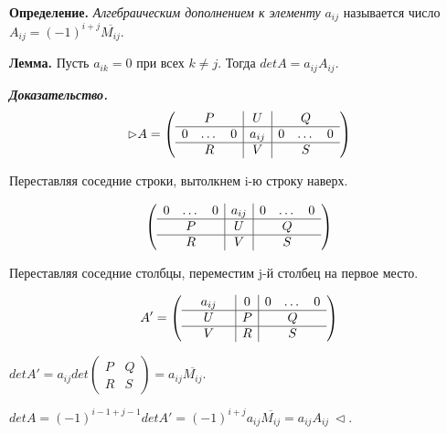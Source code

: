 \bigskip
\textbf{Определение.} \textit{Алгебраическим дополнением к элементу} $a_{ij}$ называется число $A_{ij} = (-1)^{i+j} \overline{M_{ij}}$.

\bigskip
\textbf{Лемма.} Пусть $a_{ik} = 0$ при всех $k \neq j$. Тогда $detA = a_{ij}A_{ij}$.

\textbf{\textit{Доказательство.}}
\begin{equation*} \rhd A = 
\left(
\begin{array}{ccc|c|ccc}
  & P & & U & & Q & \\
  \hline
  0 & \dots & 0 & a_{ij} & 0 & \dots & 0 \\
  \hline
  & R & & V & & S &
\end{array}
\right)
\end{equation*}

\bigskip
Переставляя соседние строки, вытолкнем i-ю строку наверх.

\begin{equation*} 
\left(
\begin{array}{ccc|c|ccc}
	0 & \dots & 0 & a_{ij} & 0 & \dots & 0 \\
  \hline
  & P & & U & & Q & \\
  \hline
  & R & & V & & S &
\end{array}
\right)
\end{equation*}

\bigskip
Переставляя соседние столбцы, переместим j-й столбец на первое место. 

\begin{equation*} A' = 
\left(
\begin{array}{ccc|c|ccc}
	 & a_{ij} &  & 0  & 0 & \dots & 0 \\
  \hline
  & U & & P & & Q & \\
  \hline
  & V & & R & & S &
\end{array}
\right)
\end{equation*}

\bigskip
$detA' = a_{ij}det \left(
\begin{array}{c|c}
  P & Q \\
  \hline
  R & S
\end{array}
\right) = a_{ij} \overline{M_{ij}}$.

\bigskip
$det A = (-1)^{i-1+j-1} det A' = (-1)^{i+j} a_{ij}\overline{M_{ij}} = a_{ij} A_{ij} \ \lhd$.


